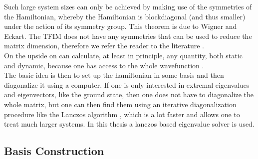 \documentclass{article}
\begin{document}
Such large system sizes can only be achieved by making use of the
symmetries of the Hamiltonian, whereby the Hamiltonian is blockdiagonal
(and thus smaller)
under the action of its symmetry group. This theorem is due to Wigner
and Eckart. The TFIM does not
have any symmetries that can be used to reduce the matrix dimension,
therefore we refer the reader to the literature
\cite{Laflorencie,Noack,Fehske}.\\
On the upside on can calculate, at least in principle, any quantity,
both static and dynamic, because one has access to the whole
wavefunction \cite{Noack}.\\
The basic idea is then to set up the hamiltonian in some basis and
then diagonalize it using a computer. If one is only interested in
extremal eigenvalues and eigenvectors, like the ground state, then one
does not have to diagonalize the whole matrix, but one can then find
them using an iterative diagonalization procedure like the Lanczos
algorithm \cite{Lanczos}, which is a lot faster and allows one to treat much larger
systems. In this thesis a lanczos based eigenvalue solver is used.\\

\subsection{Basis Construction}
\end{document}
